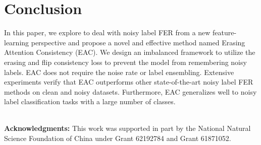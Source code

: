 \documentclass[runningheads]{llncs}
\begin{document}
 
\section{Conclusion}

In this paper, we explore to deal with noisy label FER from a new feature-learning perspective and propose a novel and effective method named Erasing Attention Consistency (EAC). We design an imbalanced framework to utilize the erasing and flip consistency loss to prevent the model from remembering noisy labels. EAC does not require the noise rate or label ensembling. Extensive experiments verify that EAC outperforms other state-of-the-art noisy label FER methods on clean and noisy datasets. Furthermore, EAC generalizes well to noisy label classification tasks with a large number of classes.



~\\
\textbf{Acknowledgments:} This work was supported in part by the National Natural Science Foundation of China under Grant 62192784 and Grant 61871052.











\end{document}
